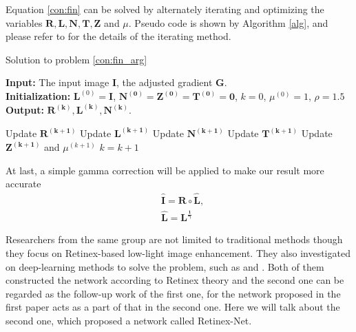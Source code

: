 \documentclass[10pt,twocolumn,letterpaper]{article}
\begin{document}
Equation \ref{con:fin} can be solved by alternately iterating and optimizing the variables $\mathbf{R,L,N,T,Z}$ and $\mu$. Pseudo code is shown by Algorithm \ref{alg}, and please refer to \cite{LiStructure} for the details of the iterating method. 

\begin{algorithm}[t]
\caption{Solution to problem \ref{con:fin_arg}} \label{alg}
\hspace*{0.02in} {\bf Input:} 
The input image $\mathbf{I}$, the adjusted gradient $\mathbf{G}$.\\
\hspace*{0.02in} {\bf Initialization:}
$\mathbf{L}^{(0)} = \mathbf{I}$, $\mathbf{N^{(0)} = Z^{(0)} = T^{(0)} = 0}$, $k = 0$, $\mu^{(0)} = 1$, $\rho = 1.5$ \\
\hspace*{0.02in} {\bf Output:} 
$\mathbf{R^{(k)}, L^{(k)}, N^{(k)}}.$ 
\begin{algorithmic}[1]
    \State Update $\mathbf{R^{(k+1)}}$
    \State Update $\mathbf{L^{(k+1)}}$
    \State Update $\mathbf{N^{(k+1)}}$
    \State Update $\mathbf{T^{(k+1)}}$
    \State Update $\mathbf{Z^{(k+1)}}$ and $\mu^{(k+1)}$
    \State $k = k + 1$
\EndWhile
\end{algorithmic}
\end{algorithm}

At last, a simple gamma correction will be applied to make our result more accurate
\begin{align}
    &\mathbf{\hat{I} = R \circ \hat{L}},\\
    &\mathbf{\hat{L} = L^{\frac{1}{\gamma}}}
\end{align}

Researchers from the same group are not limited to traditional methods though they focus on Retinex-based low-light image enhancement. They also investigated on deep-learning methods to solve the problem, such as \cite{wang2018gladnet} and \cite{Wei2018Deep}. Both of them constructed the network according to Retinex theory and the second one can be regarded as the follow-up work of the first one, for the network proposed in the first paper acts as a part of that in the second one. Here we will talk about the second one\cite{Wei2018Deep}, which proposed a network called  Retinex-Net.
\end{document}
